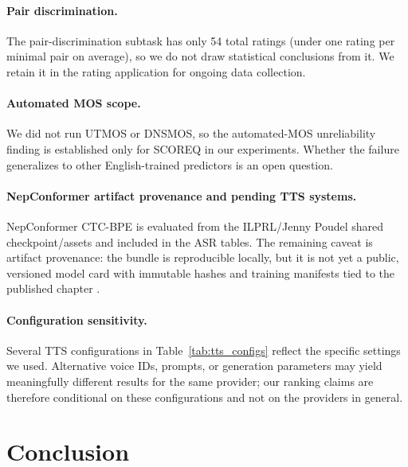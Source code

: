 \documentclass[11pt]{article}
\begin{document}
\paragraph{Pair discrimination.} The pair-discrimination subtask has only 54 total ratings (under one rating per minimal pair on average), so we do not draw statistical conclusions from it. We retain it in the rating application for ongoing data collection.

\paragraph{Automated MOS scope.} We did not run UTMOS or DNSMOS, so the automated-MOS unreliability finding is established only for SCOREQ in our experiments. Whether the failure generalizes to other English-trained predictors is an open question.

\paragraph{NepConformer artifact provenance and pending TTS systems.} NepConformer CTC-BPE is evaluated from the ILPRL/Jenny Poudel shared checkpoint/assets and included in the ASR tables. The remaining caveat is artifact provenance: the bundle is reproducible locally, but it is not yet a public, versioned model card with immutable hashes and training manifests tied to the published chapter \citep{poudel2026nepconformer}.

\paragraph{Configuration sensitivity.} Several TTS configurations in Table~\ref{tab:tts_configs} reflect the specific settings we used. Alternative voice IDs, prompts, or generation parameters may yield meaningfully different results for the same provider; our ranking claims are therefore conditional on these configurations and not on the providers in general.

\section{Conclusion}
\end{document}
